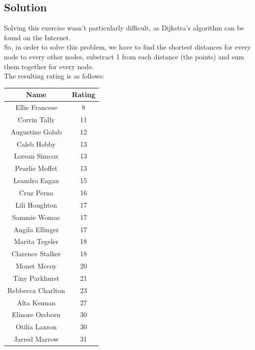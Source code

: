 \documentclass{article}
\begin{document}
    \vspace{3em}

    \subsection{Solution}
      Solving this exercise wasn't particularly difficult, as Dijkstra's
      algorithm can be found on the Internet. \\
      So, in order to solve this problem, we have to find the shortest distances
      for every node to every other nodes, substract 1 from each distance (the points)
      and sum them together for every node.\\
      The resulting rating is as follows:\\

      \vspace{2em}

      \begin{table}[H]
        \centering
        \begin{tabular}{|c|c|}
          \hline
          \textbf{Name} & \textbf{Rating} \\ \hline
          Ellie Francese    & 8 \\ \hline
          Corrin Tally      & 11 \\ \hline
          Augustine Golub   & 12 \\ \hline
          Caleb Hobby       & 13 \\ \hline
          Lorean Simcox     & 13 \\ \hline
          Pearlie Moffet    & 13 \\ \hline
          Leandro Eagan     & 15 \\ \hline
          Cruz Perna        & 16 \\ \hline
          Lili Houghton     & 17 \\ \hline
          Sammie Womac      & 17 \\ \hline
          Angila Ellinger   & 17 \\ \hline
          Marita Tegeler    & 18 \\ \hline
          Clarence Stalker  & 18 \\ \hline
          Monet Mccoy       & 20 \\ \hline
          Tiny Parkhurst    & 21 \\ \hline
          Rebbecca Charlton & 23 \\ \hline
          Alta Kennan       & 27 \\ \hline
          Elinore Orsborn   & 30 \\ \hline
          Otilia Laxson     & 30 \\ \hline
          Jarred Marrow     & 31 \\ \hline
        \end{tabular}
      \end{table}
      \newpage
\end{document}
